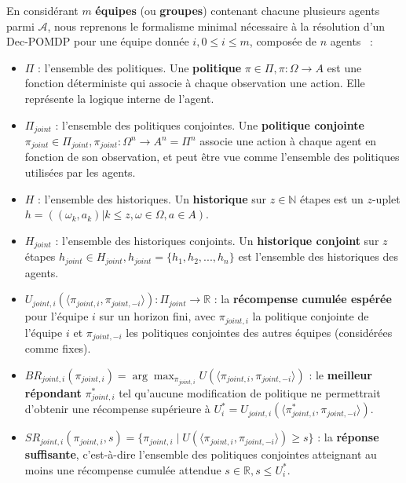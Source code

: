En considérant $m$ \textbf{équipes} (ou \textbf{groupes}) contenant chacune plusieurs agents parmi $\mathcal{A}$, nous reprenons le formalisme minimal nécessaire à la résolution d'un \ac{Dec-POMDP} pour une équipe donnée $i, 0 \leq i \leq m$, composée de $n$ agents~\cite{Beynier2013,Albrecht2024} :

\begin{itemize}
    \item $\Pi$ : l'ensemble des politiques. Une \textbf{politique} $\pi \in \Pi, \pi : \Omega \rightarrow A$ est une fonction déterministe qui associe à chaque observation une action. Elle représente la logique interne de l'agent.
    \item $\Pi_{joint}$ : l'ensemble des politiques conjointes. Une \textbf{politique conjointe} $\pi_{joint} \in \Pi_{joint}, \pi_{joint} : \Omega^n \rightarrow A^n = \Pi^n$ associe une action à chaque agent en fonction de son observation, et peut être vue comme l'ensemble des politiques utilisées par les agents.
    \item $H$ : l'ensemble des historiques. Un \textbf{historique} sur $z \in \mathbb{N}$ étapes est un $z$-uplet $h = ((\omega_k, a_k) | k \leq z, \omega \in \Omega, a \in A)$.
    \item $H_{joint}$ : l'ensemble des historiques conjoints. Un \textbf{historique conjoint} sur $z$ étapes $h_{joint} \in H_{joint}, h_{joint} = \{h_1, h_2, ..., h_n\}$ est l'ensemble des historiques des agents.
    \item $U_{joint,i}(\langle \pi_{joint,i}, \pi_{joint,-i} \rangle): \Pi_{joint} \rightarrow \mathbb{R}$ : la \textbf{récompense cumulée espérée} pour l'équipe $i$ sur un horizon fini, avec $\pi_{joint,i}$ la politique conjointe de l'équipe $i$ et $\pi_{joint,-i}$ les politiques conjointes des autres équipes (considérées comme fixes).
    \item $BR_{joint,i}(\pi_{joint,i}) = \arg\max_{\pi_{joint,i}} U(\langle \pi_{joint,i}, \pi_{joint,-i} \rangle)$ : le \textbf{meilleur répondant} $\pi^*_{joint,i}$ tel qu'aucune modification de politique ne permettrait d'obtenir une récompense supérieure à $U^*_i = U_{joint,i}(\langle \pi^*_{joint,i}, \pi_{joint,-i} \rangle)$.
    \item $SR_{joint,i}(\pi_{joint,i}, s) = \{\pi_{joint,i} \mid U(\langle \pi_{joint,i}, \pi_{joint,-i} \rangle) \geq s\}$ : la \textbf{réponse suffisante}, c'est-à-dire l'ensemble des politiques conjointes atteignant au moins une récompense cumulée attendue $s \in \mathbb{R}, s \leq U^*_i$.
\end{itemize}

